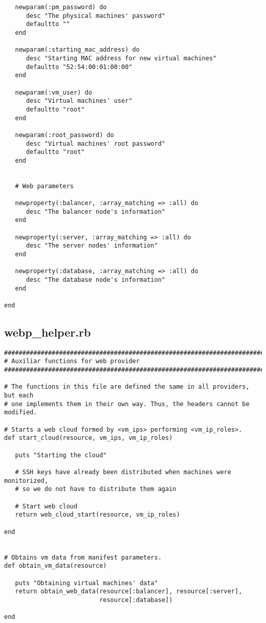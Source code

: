 \begin{lstlisting}
   newparam(:pm_password) do
      desc "The physical machines' password"
      defaultto ""
   end

   newparam(:starting_mac_address) do
      desc "Starting MAC address for new virtual machines"
      defaultto "52:54:00:01:00:00"
   end

   newparam(:vm_user) do
      desc "Virtual machines' user"
      defaultto "root"
   end

   newparam(:root_password) do
      desc "Virtual machines' root password"
      defaultto "root"
   end


   # Web parameters
   
   newproperty(:balancer, :array_matching => :all) do
      desc "The balancer node's information"
   end
   
   newproperty(:server, :array_matching => :all) do
      desc "The server nodes' information"
   end
   
   newproperty(:database, :array_matching => :all) do
      desc "The database node's information"
   end

end
\end{lstlisting}


\subsection{webp\_helper.rb}


\begin{lstlisting}
################################################################################
# Auxiliar functions for web provider
################################################################################

# The functions in this file are defined the same in all providers, but each
# one implements them in their own way. Thus, the headers cannot be modified.

# Starts a web cloud formed by <vm_ips> performing <vm_ip_roles>.
def start_cloud(resource, vm_ips, vm_ip_roles)

   puts "Starting the cloud"
   
   # SSH keys have already been distributed when machines were monitorized,
   # so we do not have to distribute them again
   
   # Start web cloud
   return web_cloud_start(resource, vm_ip_roles)

end


# Obtains vm data from manifest parameters.
def obtain_vm_data(resource)

   puts "Obtaining virtual machines' data"
   return obtain_web_data(resource[:balancer], resource[:server],
                          resource[:database])
   
end
\end{lstlisting}


